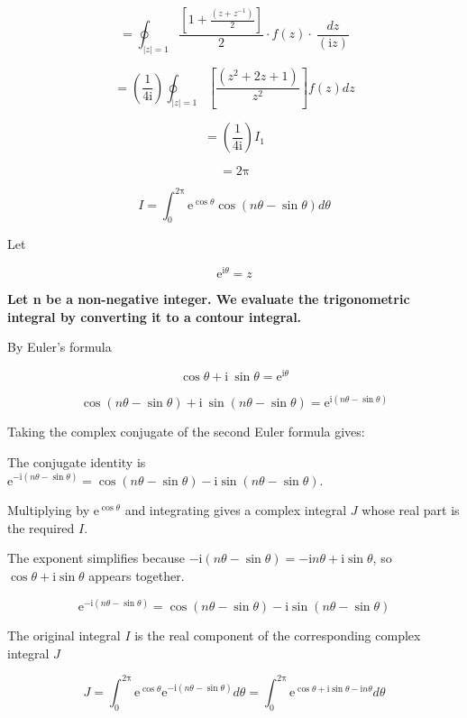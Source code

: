 \documentclass[11pt,a4paper]{article}
\theoremstyle{definition}
\theoremstyle{plain}
\begin{document}
\[
= \oint_{\vert{}z\vert{} = 1}\frac{[1 + \frac{(z + z^{-1})}{2}]}{2} \cdot f(z) \cdot \ \frac{dz}{(\mathrm{i}z)}
\]

\[
= \left(\frac{1}{4\mathrm{i}}\right)\oint_{\vert{}z\vert{} = 1}[\frac{(z^{2} + 2z + 1)}{z^{2}}]f(z)dz
\]

\[
= \left(\frac{1}{4\mathrm{i}}\right)I_{1}
\]

\[
= 2\mathrm{\pi}
\]

\[
I = \int_{0}^{2\mathrm{\pi}}\mathrm{e}^{\cos \theta}\cos(n\theta - \sin \theta)d\theta
\]

Let

\begin{equation}
\mathrm{e}^{\mathrm{i}\theta} = z
\end{equation}

\textbf{Let n be a non-negative integer. We evaluate the trigonometric integral by converting it to a contour integral.}

By Euler’s formula

\begin{equation}
\cos \theta + \mathrm{i}\ \sin \theta = \mathrm{e}^{\mathrm{i}\theta}
\end{equation}

\[
\cos(n\theta - \sin \theta) + \mathrm{i}\ \sin(n\theta - \sin \theta) = \mathrm{e}^{\mathrm{i}(n\theta - \sin \theta)}
\]

Taking the complex conjugate of the second Euler formula gives:

The conjugate identity is $\mathrm{e}^{-\mathrm{i}(n\theta - \sin \theta)} = \cos(n\theta - \sin \theta) - \mathrm{i}\sin(n\theta - \sin \theta)$.

Multiplying by $\mathrm{e}^{\cos \theta}$ and integrating gives a complex integral $J$ whose real part is the required $I$.

The exponent simplifies because $-\mathrm{i}(n\theta - \sin \theta) = -\mathrm{i}n\theta + \mathrm{i}\sin \theta$, so $\cos \theta + \mathrm{i}\sin \theta$ appears together.

\begin{equation}
\mathrm{e}^{-\mathrm{i}(n\theta - \sin \theta)} = \cos(n\theta - \sin \theta) - \mathrm{i}\sin(n\theta - \sin \theta)
\end{equation}

The original integral $I$ is the real component of the corresponding complex integral $J$

\begin{equation}
J = \int_{0}^{2\mathrm{\pi}}\mathrm{e}^{\cos \theta}\mathrm{e}^{-\mathrm{i}(n\theta - \sin \theta)} d\theta = \int_{0}^{2\mathrm{\pi}}\mathrm{e}^{\cos \theta + \mathrm{i}\sin \theta - \mathrm{i}n\theta} d\theta
\end{equation}
\end{document}
